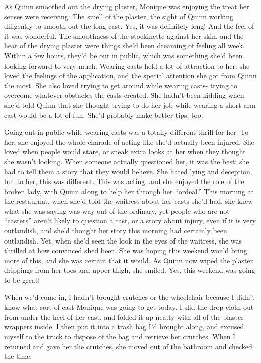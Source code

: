 \begin{thought}
As Quinn smoothed out the drying plaster, Monique was enjoying the treat her senses were
receiving: The smell of the plaster, the sight of Quinn working diligently to smooth out the
long cast. Yes, it was definitely long! And the feel of it was wonderful. The smoothness of the
stockinette against her skin, and the heat of the drying plaster were things she'd been dreaming
of feeling all week. Within a few hours, they'd be out in public, which was something she'd been
looking forward to very much. Wearing casts held a lot of attraction to her: she loved the
feelings of the application, and the special attention she got from Quinn the most. She also
loved trying to get around while wearing casts- trying to overcome whatever obstacles the casts
created. She hadn't been kidding when she'd told Quinn that she thought trying to do her job
while wearing a short arm cast would be a lot of fun. She'd probably make better tips, too.

Going out in public while wearing casts was a totally different thrill for her. To her, she
enjoyed the whole charade of acting like she'd actually been injured. She loved when people
would stare, or sneak extra looks at her when they thought she wasn't looking. When someone
actually questioned her, it was the best: she had to tell them a story that they would believe.
She hated lying and deception, but to her, this was different. This was acting, and she enjoyed
the role of the broken lady, with Quinn along to help her through her ``ordeal.'' This morning
at
the restaurant, when she'd told the waitress about her casts she'd had, she knew what she was
saying was way out of the ordinary, yet people who are not ``casters'' aren't likely to question
a
cast, or a story about injury, even if it is very outlandish, and she'd thought her story this
morning had certainly been outlandish. Yet, when she'd seen the look in the eyes of the
waitress, she was thrilled at how convinced shed been. She was hoping this weekend would bring
more of this, and she was certain that it would. As Quinn now wiped the plaster drippings from
her toes and upper thigh, she smiled. Yes, this weekend was going to be great!
\end{thought}

When we'd come in, I hadn't brought crutches or the wheelchair because I didn't know what
sort of cast Monique was going to get today. I slid the drop cloth out from under the heel of
her cast, and folded it up neatly with all of the plaster wrappers inside. I then put it into a
trash bag I'd brought along, and excused myself to the truck to dispose of the bag and retrieve
her crutches. When I returned and gave her the crutches, she moved out of the bathroom and
checked the time.

